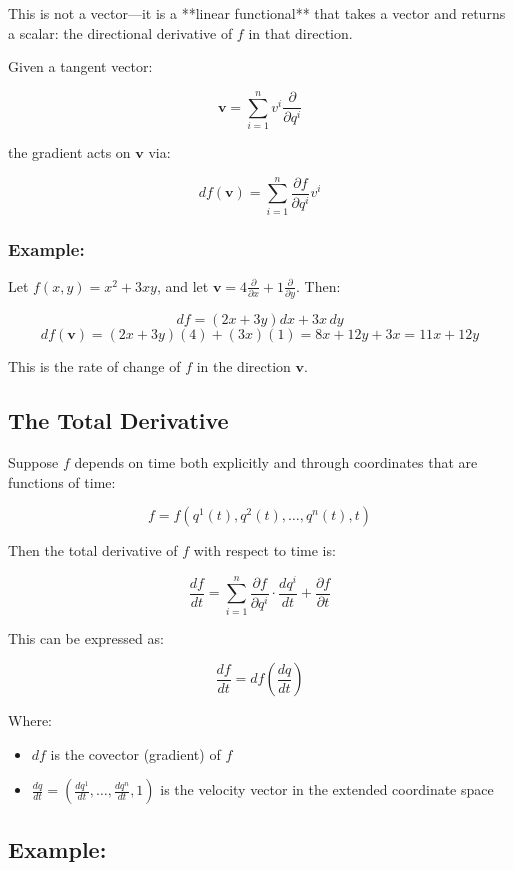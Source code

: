 \documentclass{article}
\begin{document}
This is not a vector—it is a **linear functional** that takes a vector and returns a scalar: the directional derivative of \( f \) in that direction.

Given a tangent vector:

\[
\mathbf{v} = \sum_{i=1}^n v^i \frac{\partial}{\partial q^i}
\]

the gradient acts on \( \mathbf{v} \) via:

\[
df(\mathbf{v}) = \sum_{i=1}^n \frac{\partial f}{\partial q^i} v^i
\]

\subsubsection*{Example:}

Let \( f(x, y) = x^2 + 3xy \), and let \( \mathbf{v} = 4 \frac{\partial}{\partial x} + 1 \frac{\partial}{\partial y} \). Then:

\[
df = \left(2x + 3y\right) dx + 3x \, dy
\]
\[
df(\mathbf{v}) = (2x + 3y)(4) + (3x)(1) = 8x + 12y + 3x = 11x + 12y
\]

This is the rate of change of \( f \) in the direction \( \mathbf{v} \).
\subsection{The Total Derivative}

Suppose \( f \) depends on time both explicitly and through coordinates that are functions of time:

\[
f = f(q^1(t), q^2(t), \dots, q^n(t), t)
\]

Then the total derivative of \( f \) with respect to time is:

\[
\frac{df}{dt} = \sum_{i=1}^n \frac{\partial f}{\partial q^i} \cdot \frac{dq^i}{dt} + \frac{\partial f}{\partial t}
\]

This can be expressed as:

\[
\frac{df}{dt} = df\left( \frac{dq}{dt} \right)
\]

Where:
\begin{itemize}
  \item \( df \) is the covector (gradient) of \( f \)
  \item \( \frac{dq}{dt} = \left( \frac{dq^1}{dt}, \dots, \frac{dq^n}{dt}, 1 \right) \) is the velocity vector in the extended coordinate space
\end{itemize}

\subsection*{Example:}
\end{document}
